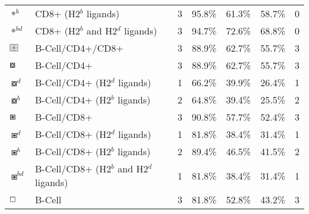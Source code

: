 \begin{tabular}{llccccc}
                                          $ \ast^b $ &                    CD8+ (H2$^b$ ligands) &            3 &         95.8\% &          61.3\% &         58.7\% &                          0 \\
                                       $ \ast^{bd} $ &         CD8+ (H2$^b$ and H2$^d$ ligands) &            3 &         94.7\% &          72.6\% &         68.8\% &                          0 \\
 $ \setlength{\fboxsep}{0.5pt} \boxed{\circledast} $ &                         B-Cell/CD4+/CD8+ &            3 &         88.9\% &          62.7\% &         55.7\% &                          3 \\
                                      $ \boxcircle $ &                              B-Cell/CD4+ &            3 &         88.9\% &          62.7\% &         55.7\% &                          3 \\
                                    $ \boxcircle^d $ &             B-Cell/CD4+ (H2$^d$ ligands) &            1 &         66.2\% &          39.9\% &         26.4\% &                          1 \\
                                    $ \boxcircle^b $ &             B-Cell/CD4+ (H2$^b$ ligands) &            2 &         64.8\% &          39.4\% &         25.5\% &                          2 \\
                                         $ \boxast $ &                              B-Cell/CD8+ &            3 &         90.8\% &          57.7\% &         52.4\% &                          3 \\
                                       $ \boxast^d $ &             B-Cell/CD8+ (H2$^d$ ligands) &            1 &         81.8\% &          38.4\% &         31.4\% &                          1 \\
                                       $ \boxast^b $ &             B-Cell/CD8+ (H2$^b$ ligands) &            2 &         89.4\% &          46.5\% &         41.5\% &                          2 \\
                                    $ \boxast^{bd} $ &  B-Cell/CD8+ (H2$^b$ and H2$^d$ ligands) &            1 &         81.8\% &          38.4\% &         31.4\% &                          1 \\
                                       $ \boxempty $ &                                   B-Cell &            3 &         81.8\% &          52.8\% &         43.2\% &                          3 \\
\bottomrule
\end{tabular}
